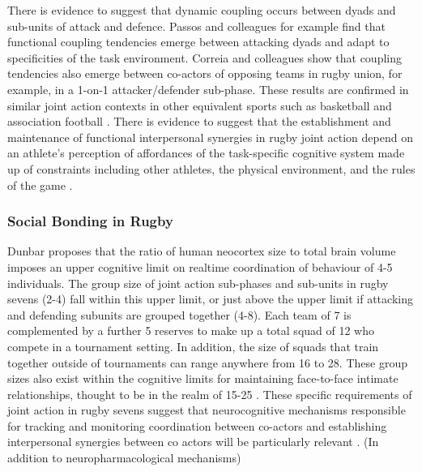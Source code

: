   There is evidence to suggest that dynamic coupling occurs between dyads and sub-units of attack and defence\citep{Passos2011,Correia2014}.  Passos and colleagues \textcite{Passos2011} for example find that functional coupling tendencies emerge between attacking dyads and adapt to specificities of the task environment.  Correia and colleagues \textcite{Correia2014} show that coupling tendencies also emerge between co-actors of opposing teams in rugby union, for example, in a 1-on-1 attacker/defender sub-phase.  These results are confirmed in similar joint action contexts in other equivalent sports such as basketball and association football \citep{Duarte2013}. There is evidence to suggest that the establishment and maintenance of functional  interpersonal synergies in rugby joint action depend on an athlete's perception of affordances of the task-specific cognitive system made up of constraints including other athletes, the physical environment, and the rules of the game \citep{Passos2012}.


\subsubsection{Social Bonding in Rugby}
  Dunbar \textcite{Dunbar1992} proposes that the ratio of human neocortex size to total brain volume imposes an upper cognitive limit on realtime coordination of behaviour of  4-5 individuals.  The group size of joint action sub-phases and sub-units in rugby sevens (2-4) fall within this upper limit, or just above the upper limit if attacking and defending subunits are grouped together (4-8).  Each team of 7 is complemented by a further 5 reserves to make up a total squad of 12 who compete in a tournament setting.  In addition, the size of squads that train together outside of tournaments can range anywhere from 16 to 28.
  These group sizes also exist within the cognitive limits for maintaining face-to-face intimate relationships, thought to be in the realm of 15-25 \citep{Dunbar1992,Dunbar2010}. These specific requirements of joint action in rugby sevens suggest that neurocognitive mechanisms responsible for tracking and monitoring coordination between co-actors and establishing interpersonal synergies between co actors will be particularly relevant \citep{Mogan2017}. (In addition to neuropharmacological mechanisms)

